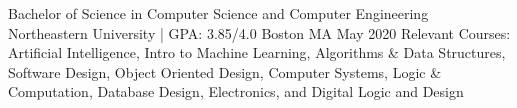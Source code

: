 

\begin{cventries}

  \cventry
    {Bachelor of Science in Computer Science and Computer Engineering} %
    {Northeastern University | GPA: 3.85/4.0} %
    {Boston MA} %
    {May 2020} %
    {
      Relevant Courses: Artificial Intelligence, Intro to Machine Learning, Algorithms \& Data Structures, Software Design, Object Oriented Design, Computer Systems, Logic \& Computation, Database Design, Electronics, and Digital Logic and Design
    }

\end{cventries}
